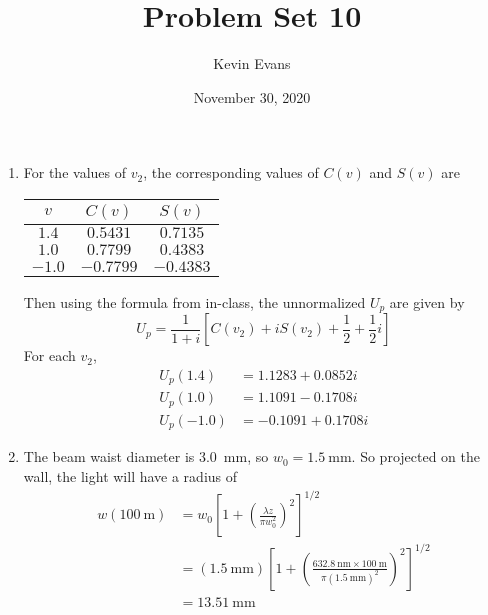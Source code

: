 \documentclass{homework}
\title{Problem Set 10}
\author{Kevin Evans}
\date{November 30, 2020}
\begin{document}
	\maketitle
	\begin{enumerate}
		\item For the values of $v_2$, the corresponding values of $C(v)$ and $S(v)$ are
		
		\begin{center}
			\begin{tabular}{ccc}
				\toprule
				$v$ & $C(v)$ & $S(v)$ \\
				\midrule
				$1.4$ & $0.5431$ & $0.7135$ \\
				$1.0$ & $0.7799$ & $0.4383$ \\
				$-1.0$ & $-0.7799$ & $-0.4383$ \\
				\bottomrule
			\end{tabular}
		\end{center}
		Then using the formula from in-class, the unnormalized $U_p$ are given by \[ U_p = \frac{1}{1+i} \left[ C(v_2) + i S(v_2) + \frac{1}{2} + \frac{1}{2}i \right] \]
		For each $v_2$,
		\begin{align*}
			U_p(1.4) & = 1.1283 + 0.0852i \\
			U_p(1.0) & = 1.1091-0.1708i \\
			U_p(-1.0) & = -0.1091+0.1708i
		\end{align*}
		
		\item The beam waist diameter is \SI{3.0}{\mm}, so $w_0 = \SI{1.5}{\mm}$. So projected on the wall, the light will have a radius of \begin{align*}
			w(\SI{100}{\m}) & = w_0 \left[1+\left( \frac{\lambda z}{\pi w_0^2}\right)^2\right]^{1/2} \\
				& = \left(\SI{1.5}{\mm}\right)
					\left[ 1 + \left(\frac{\SI{632.8}{\nm} \times \SI{100}{\m}}{\pi \left(\SI{1.5}{\mm}\right)^2}\right)^2\right]^{1/2} \\
					& = \SI{13.51}{\mm}
 		\end{align*}
	\end{enumerate}
\end{document}
